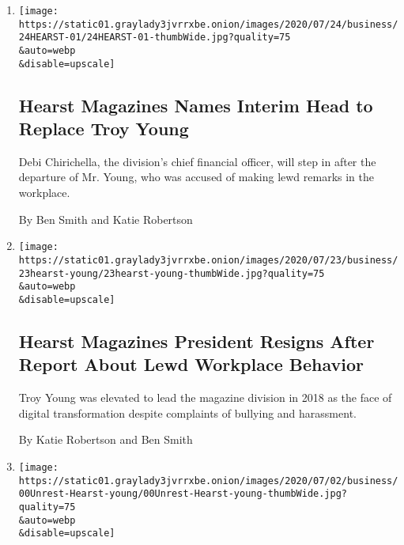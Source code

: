 \begin{enumerate}
\def\labelenumi{\arabic{enumi}.}
\item
  \href{/2020/07/24/business/media/hearst-troy-young-replacement-president.html}{}

  \texttt{[image: https://static01.graylady3jvrrxbe.onion/images/2020/07/24/business/24HEARST-01/24HEARST-01-thumbWide.jpg?quality=75\\\&auto=webp\\\&disable=upscale]}

  \hypertarget{hearst-magazines-names-interim-head-to-replace-troy-young}{%
  \subsection{Hearst Magazines Names Interim Head to Replace Troy
  Young}\label{hearst-magazines-names-interim-head-to-replace-troy-young}}

  Debi Chirichella, the division's chief financial officer, will step in
  after the departure of Mr. Young, who was accused of making lewd
  remarks in the workplace.

  By Ben Smith and Katie Robertson
\item
  \href{/2020/07/23/business/troy-young-hearst-magazines.html}{}

  \texttt{[image: https://static01.graylady3jvrrxbe.onion/images/2020/07/23/business/23hearst-young/23hearst-young-thumbWide.jpg?quality=75\\\&auto=webp\\\&disable=upscale]}

  \hypertarget{hearst-magazines-president-resigns-after-report-about-lewd-workplace-behavior}{%
  \subsection{Hearst Magazines President Resigns After Report About Lewd
  Workplace
  Behavior}\label{hearst-magazines-president-resigns-after-report-about-lewd-workplace-behavior}}

  Troy Young was elevated to lead the magazine division in 2018 as the
  face of digital transformation despite complaints of bullying and
  harassment.

  By Katie Robertson and Ben Smith
\item
  \href{/2020/07/22/business/media/hearst-harassment-troy-young.html}{}

  \texttt{[image: https://static01.graylady3jvrrxbe.onion/images/2020/07/02/business/00Unrest-Hearst-young/00Unrest-Hearst-young-thumbWide.jpg?quality=75\\\&auto=webp\\\&disable=upscale]}

  \hypertarget{hearst-employees-say-magazine-boss-led-toxic-culture}{%
}
\end{enumerate}
